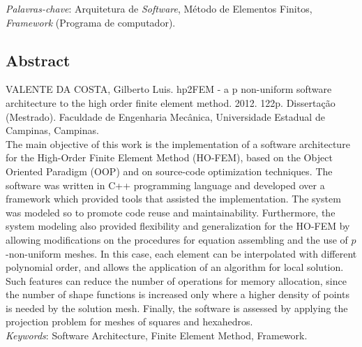 \vspace{1cm}
\noindent
\emph{ Palavras-chave}: Arquitetura de \textit{Software}, Método de Elementos Finitos,
\textit{Framework} (Programa de computador).\\


\clearpage
\setcounter{page}{15}

\begin{center}
\chapter*{Abstract}
\end{center}
\vspace{24pt}
\noindent
VALENTE DA COSTA, Gilberto Luis. hp2FEM - a p non-uniform software architecture to the high order
finite element method. 2012. 122p. Dissertação (Mestrado). Faculdade de Engenharia Mecânica,
Universidade Estadual de Campinas, Campinas.\\

The main objective of this work is the implementation of a software architecture for the High-Order
Finite Element Method (HO-FEM), based on the Object Oriented Paradigm (OOP) and on source-code
optimization techniques. The software was written in C++ programming language and developed over a
framework which provided tools that assisted the implementation. The system was modeled so to
promote code reuse and maintainability. Furthermore, the system modeling also provided flexibility
and generalization for the HO-FEM by allowing modifications on the procedures for equation
assembling and the use of $p$-non-uniform meshes. In this case, each element can be interpolated
with different polynomial order, and allows the application of an algorithm for local solution. Such
features can reduce the number of operations for memory allocation, since the number of shape
functions is increased only where a higher density of points is needed by the solution mesh.
Finally, the software is assessed by applying the projection problem for meshes of squares and
hexahedros.\\

\vspace{1cm}
\noindent
\emph{Keywords}: Software Architecture, Finite Element Method, Framework.



